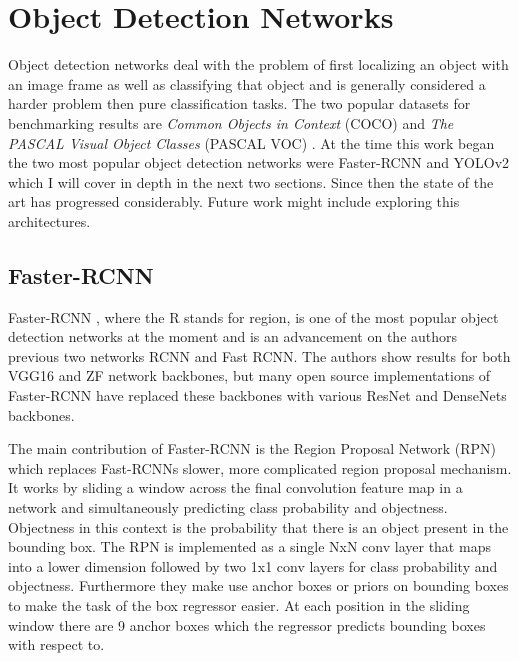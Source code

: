 \section{Object Detection Networks}

Object detection networks deal with the problem of first localizing an object with an image frame as well as classifying that object and is generally considered a harder problem then pure classification tasks. The two popular datasets for benchmarking results are \textit{Common Objects in Context} (COCO) \cite{COCO} and \textit{The PASCAL Visual Object Classes} (PASCAL VOC) \cite{VOC}. At the time this work began the two most popular object detection networks were Faster-RCNN and YOLOv2 which I will cover in depth in the next two sections. Since then the state of the art has progressed considerably. Future work might include exploring this architectures.

\subsection{Faster-RCNN}

Faster-RCNN \cite{FASTER-RCNN}, where the R stands for region, is one of the most popular object detection networks at the moment and is an advancement on the authors previous two networks RCNN and Fast RCNN. The authors show results for both VGG16 and ZF network backbones, but many open source implementations of Faster-RCNN have replaced these backbones with various ResNet and DenseNets backbones.

The main contribution of Faster-RCNN is the Region Proposal Network (RPN) which replaces Fast-RCNNs slower, more complicated region proposal mechanism. It works by sliding a window across the final convolution feature map in a network and simultaneously predicting class probability and objectness. Objectness in this context is the probability that there is an object present in the bounding box. The RPN is implemented as a single NxN conv layer that maps into a lower dimension followed by two 1x1 conv layers for class probability and objectness. Furthermore they make use anchor boxes or priors on bounding boxes to make the task of the box regressor easier. At each position in the sliding window there are 9 anchor boxes which the regressor predicts bounding boxes with respect to.

